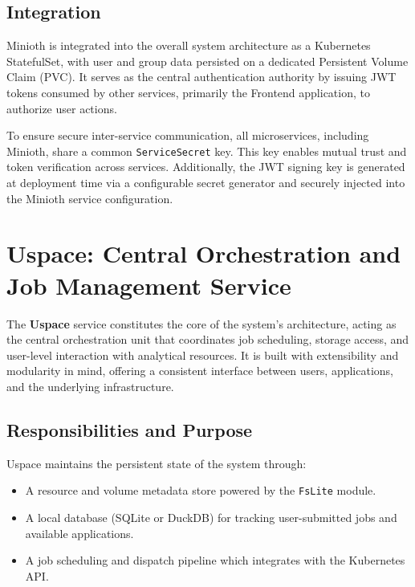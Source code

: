 \subsection{Integration}

Minioth is integrated into the overall system architecture as a Kubernetes StatefulSet, with user and group data persisted on a dedicated Persistent Volume Claim (PVC). It serves as the central authentication authority by issuing JWT tokens consumed by other services, primarily the Frontend application, to authorize user actions.

To ensure secure inter-service communication, all microservices, including Minioth, share a common \texttt{ServiceSecret} key. This key enables mutual trust and token verification across services. Additionally, the JWT signing key is generated at deployment time via a configurable secret generator and securely injected into the Minioth service configuration.


\newpage



\section{Uspace: Central Orchestration and Job Management Service}
\label{sec:uspace}

The \textbf{Uspace} service constitutes the core of the system’s architecture, 
acting as the central orchestration unit that coordinates job scheduling, 
storage access, and user-level interaction with analytical resources. 
It is built with extensibility and modularity in mind, offering a consistent 
interface between users, applications, and the underlying infrastructure.

\subsection{Responsibilities and Purpose}

Uspace maintains the persistent state of the system through:
\begin{itemize}
    \item A resource and volume metadata store powered by the \texttt{FsLite} module.
    \item A local database (SQLite or DuckDB) for tracking user-submitted jobs and available applications.
    \item A job scheduling and dispatch pipeline which integrates with the Kubernetes API.
\end{itemize}


